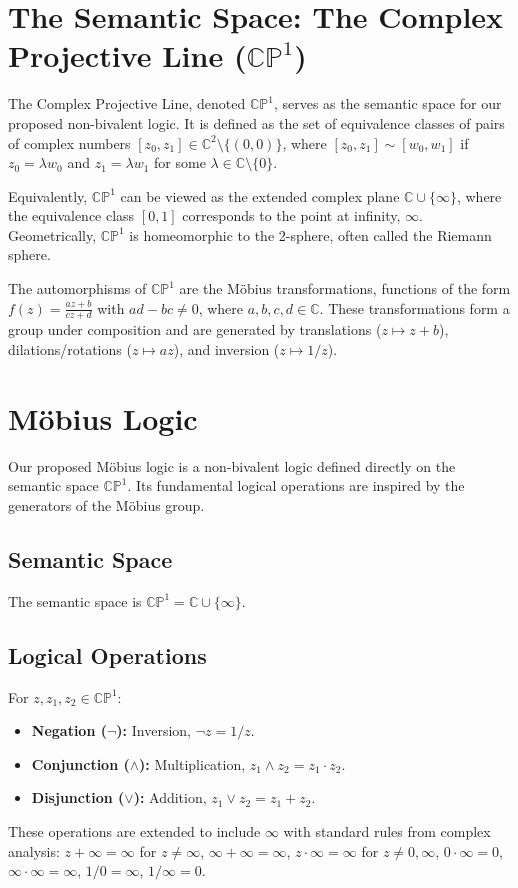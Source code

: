 	
	
	\section{The Semantic Space: The Complex Projective Line ($\mathbb{CP}^1$)}
	
	The Complex Projective Line, denoted $\mathbb{CP}^1$, serves as the semantic space for our proposed non-bivalent logic. It is defined as the set of equivalence classes of pairs of complex numbers $[z_0, z_1] \in \mathbb{C}^2 \setminus \{(0,0)\}$, where $[z_0, z_1] \sim [w_0, w_1]$ if $z_0 = \lambda w_0$ and $z_1 = \lambda w_1$ for some $\lambda \in \mathbb{C} \setminus \{0\}$.
	
	Equivalently, $\mathbb{CP}^1$ can be viewed as the extended complex plane $\mathbb{C} \cup \{\infty\}$, where the equivalence class $[0, 1]$ corresponds to the point at infinity, $\infty$. Geometrically, $\mathbb{CP}^1$ is homeomorphic to the 2-sphere, often called the Riemann sphere.
	
	The automorphisms of $\mathbb{CP}^1$ are the M\"{o}bius transformations, functions of the form $f(z) = \frac{az+b}{cz+d}$ with $ad-bc \neq 0$, where $a, b, c, d \in \mathbb{C}$. These transformations form a group under composition and are generated by translations ($z \mapsto z+b$), dilations/rotations ($z \mapsto az$), and inversion ($z \mapsto 1/z$).
	
	\section{Möbius Logic}
	
	Our proposed M\"{o}bius logic is a non-bivalent logic defined directly on the semantic space $\mathbb{CP}^1$. Its fundamental logical operations are inspired by the generators of the M\"{o}bius group.
	
	\subsection{Semantic Space}
	The semantic space is $\mathbb{CP}^1 = \mathbb{C} \cup \{\infty\}$.
	
	\subsection{Logical Operations}
	For $z, z_1, z_2 \in \mathbb{CP}^1$:
	\begin{itemize}
		\item \textbf{Negation ($\neg$):} Inversion, $\neg z = 1/z$.
		\item \textbf{Conjunction ($\wedge$):} Multiplication, $z_1 \wedge z_2 = z_1 \cdot z_2$.
		\item \textbf{Disjunction ($\vee$):} Addition, $z_1 \vee z_2 = z_1 + z_2$.
	\end{itemize}
	These operations are extended to include $\infty$ with standard rules from complex analysis: $z+\infty = \infty$ for $z \neq \infty$, $\infty+\infty=\infty$, $z \cdot \infty = \infty$ for $z \neq 0, \infty$, $0 \cdot \infty = 0$, $\infty \cdot \infty = \infty$, $1/0 = \infty$, $1/\infty = 0$.
	
